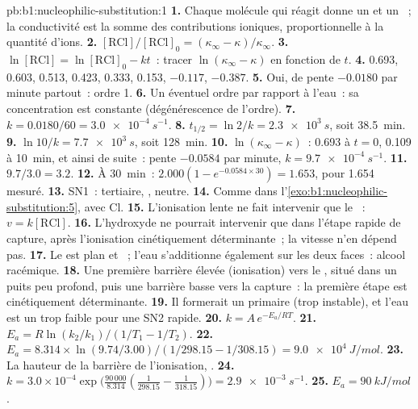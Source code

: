\begin{solution}{pb:b1:nucleophilic-substitution:1}
\textbf{1.} Chaque molécule qui réagit donne un  et un ~;
la conductivité est la somme des contributions ioniques, proportionnelle
à la quantité d'ions.
\textbf{2.} $[\mathrm{RCl}]/[\mathrm{RCl}]_0 = (\kappa_\infty -
\kappa)/\kappa_\infty$.
\textbf{3.} $\ln[\mathrm{RCl}] = \ln[\mathrm{RCl}]_0 - kt$~: tracer
$\ln(\kappa_\infty - \kappa)$ en fonction de $t$.
\textbf{4.} 0.693, 0.603, 0.513, 0.423, 0.333, 0.153, $-0.117$, $-0.387$.
\textbf{5.} Oui, de pente $-0.0180$ par minute partout~: ordre 1.
\textbf{6.} Un éventuel ordre par rapport à l'eau~: sa concentration est
constante (dégénérescence de l'ordre).
\textbf{7.} $k = 0.0180/60 = \qty{3.0e-4}{s^{-1}}$.
\textbf{8.} $t_{1/2} = \ln 2/k = \qty{2.3e3}{s}$, soit \qty{38.5}{min}.
\textbf{9.} $\ln 10/k = \qty{7.7e3}{s}$, soit \qty{128}{min}.
\textbf{10.} $\ln(\kappa_\infty - \kappa)$~: 0.693 à $t = 0$, 0.109 à
\qty{10}{min}, et ainsi de suite~: pente $-0.0584$ par minute,
$k = \qty{9.7e-4}{s^{-1}}$.
\textbf{11.} $9.7/3.0 = 3.2$.
\textbf{12.} À \qty{30}{min}~: $2.000(1 - e^{-0.0584 \times 30}) = 1.653$,
pour 1.654 mesuré.
\textbf{13.} SN1~:  tertiaire, , 
neutre.
\textbf{14.} Comme dans l'\cref{exo:b1:nucleophilic-substitution:5}, avec
Cl.
\textbf{15.} L'ionisation lente ne fait intervenir que le ~: $v =
k[\mathrm{RCl}]$.
\textbf{16.} L'hydroxyde ne pourrait intervenir que dans l'étape rapide
de capture, après l'ionisation cinétiquement déterminante~; la vitesse
n'en dépend pas.
\textbf{17.} Le  est plan et ~; l'eau s'additionne
également sur les deux faces~: alcool racémique.
\textbf{18.} Une première barrière élevée (ionisation) vers le
, situé dans un puits peu profond, puis une barrière basse
vers la capture~: la première étape est cinétiquement déterminante.
\textbf{19.} Il formerait un  primaire (trop instable), et
l'eau est un  trop faible pour une SN2 rapide.
\textbf{20.} $k = A\,e^{-E_a/RT}$.
\textbf{21.} $E_a = R\ln(k_2/k_1)/(1/T_1 - 1/T_2)$.
\textbf{22.} $E_a = 8.314 \times \ln(9.74/3.00)/(1/298.15 - 1/308.15) =
\qty{9.0e4}{J/mol}$.
\textbf{23.} La hauteur de la barrière de l'ionisation, .
\textbf{24.} $k = 3.0 \times 10^{-4} \exp\bigl(\frac{90\,000}{8.314}
(\frac{1}{298.15} - \frac{1}{318.15})\bigr) = \qty{2.9e-3}{s^{-1}}$.
\textbf{25.} \textbf{$E_a = \qty{90}{kJ/mol}$}.
\end{solution}
